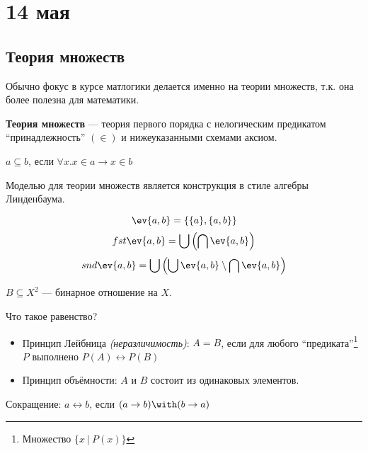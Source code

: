 \chapter{14 мая}

\section{Теория множеств}

\begin{remark}
    Обычно фокус в курсе матлогики делается именно на теории множеств, т.к. она более полезна для математики.
\end{remark}

\begin{definition}
    \textbf{Теория множеств} --- теория первого порядка с нелогическим предикатом ``принадлежность'' \((\in)\) и нижеуказанными схемами аксиом.
\end{definition}

\begin{definition}
    \(a \subseteq b\), если \(\forall x.x \in a \to x \in b\)
\end{definition}

\begin{remark}
    Моделью для теории множеств является конструкция в стиле алгебры Линденбаума.
\end{remark}

\begin{definition}[пара]
    \[\ev{a, b} = \{\{a\}, \{a, b\}\}\]
    \[fst\ev{a, b} = \bigcup \left(\bigcap \ev{a, b}\right)\]
    \[snd\ev{a, b} = \bigcup \left(\bigcup \ev{a, b} \setminus \bigcap \ev{a, b}\right)\]
\end{definition}

\begin{definition}
    \(B \subseteq X^2\) --- бинарное отношение на \(X\).
\end{definition}

Что такое равенство?
\begin{itemize}
    \item Принцип Лейбница \textit{(неразличимость)}: \(A = B\), если для любого ``предиката''\footnote{Множество \(\{x\ |\ P(x)\}\)} \(P\) выполнено \(P(A) \leftrightarrow P(B)\)
    \item Принцип объёмности: \(A\) и \(B\) состоит из одинаковых элементов.
\end{itemize}

Сокращение: \(a \leftrightarrow b\), если \((a \to b) \with (b \to a)\)

